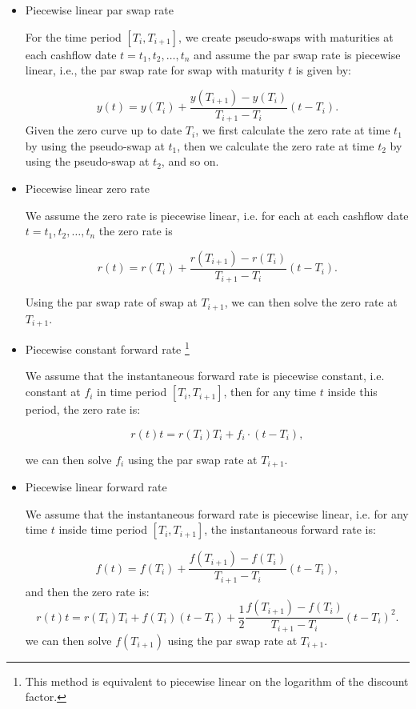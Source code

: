\begin{itemize}
  \item Piecewise linear par swap rate

  For the time period $[T_i,T_{i+1}]$, we create pseudo-swaps with maturities 
  at each cashflow date $t=t_1,t_2,\dots,t_n$ and assume the par swap rate is 
  piecewise linear, i.e., the par swap rate for swap with maturity $t$ is given
  by:

  \[
	y(t) = y(T_i) + \frac{y(T_{i+1})-y(T_i)}{T_{i+1}-T_i} (t-T_i).
  \]
  Given the zero curve up to date $T_i$, we first calculate the zero rate at
  time $t_1$ by using the pseudo-swap at $t_1$, then we calculate the zero 
  rate at time $t_2$ by using the pseudo-swap at $t_2$, and so on.

  \item Piecewise linear zero rate

  We assume the zero rate is piecewise linear, i.e. for each 
  at each cashflow date $t=t_1,t_2,\dots,t_n$ the zero rate is

  \[
	r(t) = r(T_i) + \frac{r(T_{i+1})-r(T_i)}{T_{i+1}-T_i} (t-T_i).
  \]

  Using the par swap rate of swap at $T_{i+1}$, we can then solve the zero rate
  at $T_{i+1}$.

  \item Piecewise constant forward rate
  \footnote{This method is equivalent to piecewise linear on the logarithm of
	  the discount factor.}

  We assume that the instantaneous forward rate is piecewise constant, i.e.
  constant at $f_i$ in time period $[T_i,T_{i+1}]$, then for any time $t$ 
  inside this period, the zero rate is: 

  \[
	  r(t) t = r(T_i) T_i + f_i \cdot (t-T_i),
  \]

  we can then solve $f_i$ using the par swap rate at $T_{i+1}$.


  \item Piecewise linear forward rate

  We assume that the instantaneous forward rate is piecewise linear, i.e.
  for any time $t$ inside time period $[T_i,T_{i+1}]$, the instantaneous forward
  rate is: 

  \[
	f(t) = f(T_i) + \frac{f(T_{i+1})-f(T_i)}{T_{i+1}-T_i} (t-T_i),
  \]
  and then the zero rate is:
  \[
	r(t) t = r(T_i) T_i + f(T_i) (t-T_i)
	         + \frac{1}{2} \frac{f(T_{i+1})-f(T_i)}{T_{i+1}-T_i} (t-T_i)^2.
  \]
  we can then solve $f(T_{i+1})$ using the par swap rate at $T_{i+1}$.


\end{itemize}
